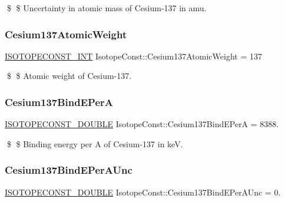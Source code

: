 \$ \$ Uncertainty in atomic mass of Cesium-\/137 in amu. \mbox{\label{group___isotope_const-_cesium-_cs137_gacf61ae78872c849238452fcec09c91c3}} 
\subsubsection{\texorpdfstring{Cesium137\+Atomic\+Weight}{Cesium137AtomicWeight}}
{\footnotesize\ttfamily \mbox{\hyperlink{group___isotope_const-_macros_ga5f18360b3e99483a35c32d789e62621c}{I\+S\+O\+T\+O\+P\+E\+C\+O\+N\+S\+T\+\_\+\+I\+NT}} Isotope\+Const\+::\+Cesium137\+Atomic\+Weight = 137}

\$ \$ Atomic weight of Cesium-\/137. \mbox{\label{group___isotope_const-_cesium-_cs137_ga0a7179e7fa66d9d926493d7a9b5356e3}} 
\subsubsection{\texorpdfstring{Cesium137\+Bind\+E\+PerA}{Cesium137BindEPerA}}
{\footnotesize\ttfamily \mbox{\hyperlink{group___isotope_const-_macros_ga8f45a7272ce02c0b4c65c44636ed719a}{I\+S\+O\+T\+O\+P\+E\+C\+O\+N\+S\+T\+\_\+\+D\+O\+U\+B\+LE}} Isotope\+Const\+::\+Cesium137\+Bind\+E\+PerA = 8388.}

\$ \$ Binding energy per A of Cesium-\/137 in keV. \mbox{\label{group___isotope_const-_cesium-_cs137_gacecb5c2ea3ce990b160a470e785a3bf6}} 
\subsubsection{\texorpdfstring{Cesium137\+Bind\+E\+Per\+A\+Unc}{Cesium137BindEPerAUnc}}
{\footnotesize\ttfamily \mbox{\hyperlink{group___isotope_const-_macros_ga8f45a7272ce02c0b4c65c44636ed719a}{I\+S\+O\+T\+O\+P\+E\+C\+O\+N\+S\+T\+\_\+\+D\+O\+U\+B\+LE}} Isotope\+Const\+::\+Cesium137\+Bind\+E\+Per\+A\+Unc = 0.}

